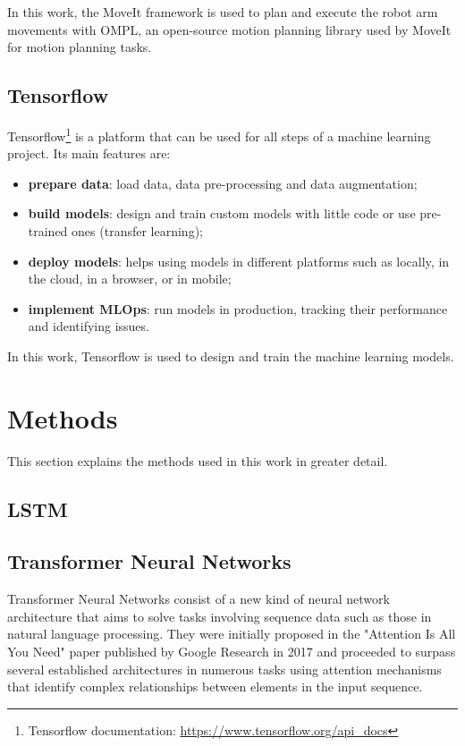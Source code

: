 In this work, the MoveIt framework is used to plan and execute the robot arm movements with OMPL, an open-source motion planning library used by MoveIt for motion planning tasks.

\subsection{Tensorflow}

Tensorflow\footnote{Tensorflow documentation: \url{https://www.tensorflow.org/api_docs}} is a platform that can be used for all steps of a machine learning project. Its main features are:
\begin{itemize}
    \item \textbf{prepare data}: load data, data pre-processing and data augmentation;
    \item \textbf{build models}: design and train custom models with little code or use pre-trained ones (transfer learning);
    \item \textbf{deploy models}: helps using models in different platforms such as locally, in the cloud, in a browser, or in mobile;
    \item \textbf{implement MLOps}: run models in production, tracking their performance and identifying issues.
\end{itemize}

In this work, Tensorflow is used to design and train the machine learning models.

\section{Methods}

This section explains the methods used in this work in greater detail.

\subsection{LSTM}

\subsection{Transformer Neural Networks}

Transformer Neural Networks consist of a new kind of neural network architecture that aims to solve tasks involving sequence data such as those in natural language processing. They were initially proposed in the "Attention Is All You Need" paper published by Google Research in 2017\cite{Vaswani2017} and proceeded to surpass several established architectures in numerous tasks using attention mechanisms that identify complex relationships between elements in the input sequence.

